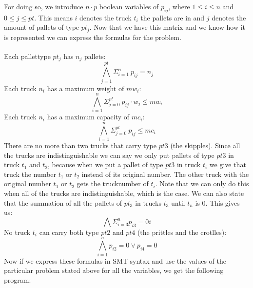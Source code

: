 \documentclass[12pt]{article}
\begin{document}
For doing so, we introduce $n \cdot p$ boolean variables of $p_{ij}$, where $1 \leq i \leq n$ and $0 \leq j \leq pt$. This means $i$ denotes the truck $t_i$ the pallets are in and $j$ denotes the amount of pallets of type $pt_j$. Now that we have this matrix and we know how it is represented we can express the formulas for the problem.
\\
\\
Each pallettype $pt_j$ has $n_j$ pallets:
\[\bigwedge_{j=1}^{pt} \Sigma_{i=1}^{n} \ p_{ij} = n_j\]
Each truck $n_i$ has a maximum weight of $mw_i$:
\[\bigwedge_{i=1}^{n} \Sigma_{j=0}^{pt} \ p_{ij} \cdot w_j \leq mw_i\]
Each truck $n_i$ has a maximum capacity of $mc_i$:
\[\bigwedge_{i=1}^{n} \Sigma_{j=0}^{pt} \ p_{ij}\leq mc_i\]
There are no more than two trucks that carry type $pt3$ (the skipples). Since all the trucks are indistinguishable we can say we only put pallets of type $pt3$ in truck $t_1$ and $t_2$, because when we put a pallet of type $pt3$ in truck $t_i$ we give that truck the number $t_1$ or $t_2$ instead of its original number. The other truck with the original number $t_1$ or $t_2$ gets the trucknumber of $t_i$. Note that we can only do this when all of the trucks are indistinguishable, which is the case. We can also state that the summation of all the pallets of $pt_3$ in trucks $t_3$ until $t_n$ is 0. This gives us:
\[\bigwedge \Sigma_{i=3}^{n} p_{i3} = 0i\]
No truck $t_i$ can carry both type $pt2$ and $pt4$ (the prittles and the crotlles):
\[\bigwedge_{i=1}^{n} p_{i2} = 0 \vee p_{i4} = 0 \]
Now if we express these formulas in SMT syntax and use the values of the particular problem stated above for all the variables, we get the following program:
\end{document}
